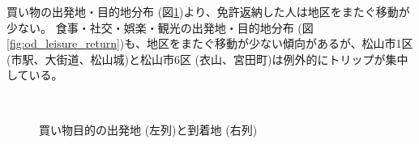 \documentclass[a4paper,12pt, uplatex]{jsbook}
\begin{document}
買い物の出発地・目的地分布 (図\ref{fig:od_shopping_return})より、免許返納した人は地区をまたぐ移動が少ない。
食事・社交・娯楽・観光の出発地・目的地分布 (図\ref{fig:od_leisure_return})も、地区をまたぐ移動が少ない傾向があるが、松山市1区 (市駅、大街道、松山城)と松山市6区 (衣山、宮田町)は例外的にトリップが集中している。
%
\begin{figure}[htbp]
  \centering
  \\%
    \caption{買い物目的の出発地 (左列)と到着地 (右列)}
  	\label{fig:od_shopping_return}
\end{figure}
%
\end{document}

